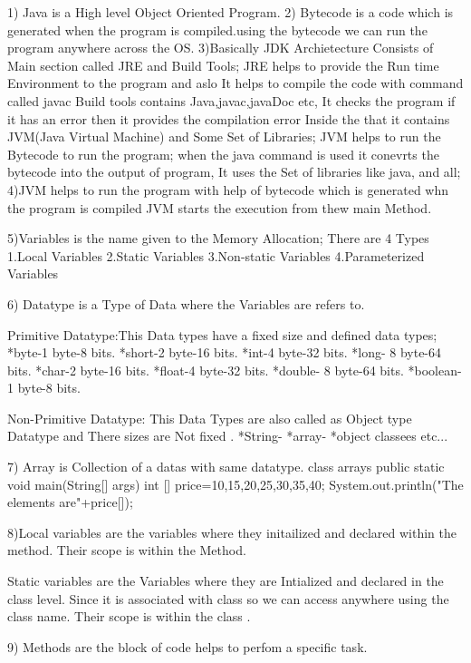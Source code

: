 1) Java is a High level Object Oriented Program.
2) Bytecode is a code which is generated when the program is compiled.using the bytecode we can run the program anywhere  across the OS.
3)Basically JDK Archietecture Consists of  Main section called JRE and Build Tools; JRE helps to provide the Run time Environment to the program and aslo It helps to compile the code with command called javac
   Build tools contains Java,javac,javaDoc etc, It checks the program if it has an error then it provides the compilation error
   Inside the that it contains JVM(Java Virtual Machine) and Some Set of Libraries;
   JVM helps to run the Bytecode to run the program;
   when the java command is used it conevrts the bytecode into the output of program, It uses the Set of libraries like java, and all;
4)JVM helps to run the program with help of bytecode which is generated whn the program is compiled
    JVM starts the execution from thew main Method.

5)Variables is the name given to the Memory Allocation; 
  There are 4 Types
  1.Local Variables
  2.Static Variables
  3.Non-static Variables
  4.Parameterized Variables
  
6) Datatype is a Type of Data where the Variables are refers to.
   
   Primitive Datatype:This Data types have a  fixed size and defined data types;
   *byte-1 byte-8 bits.
   *short-2 byte-16 bits.
   *int-4 byte-32 bits.
   *long- 8 byte-64 bits.
   *char-2 byte-16 bits.
   *float-4 byte-32 bits.
   *double- 8 byte-64 bits.
   *boolean- 1 byte-8 bits.
   
   Non-Primitive Datatype: This Data Types are also called as Object type Datatype and There sizes are Not fixed .
   *String- 
   *array-
   *object classees etc...
   
7) Array is Collection of a datas with same datatype.
  class arrays{
  public static void main(String[] args){
  int [] price={10,15,20,25,30,35,40};
  System.out.println("The elements are"+price[]);
  }
  }
   
8)Local variables are the variables where they initailized and declared within the method.
   Their scope is within the Method.
   
  Static variables are the Variables where they are Intialized and declared in the class level. Since  it is associated with class
  so we can access anywhere using the class name.
  Their scope is within the class .
  
9) Methods are the block of code helps to perfom a specific task.

